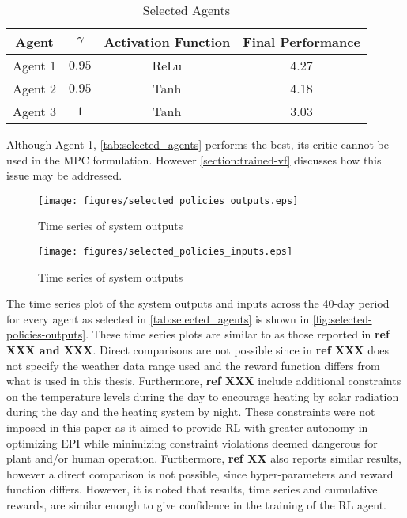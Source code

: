 \begin{table}[h]
    \centering
    \begin{tabular}{|c|c|c|c|}
    \hline
         Agent & $\gamma$ & Activation Function & Final Performance \\
         \hline
         Agent 1& $0.95$ & ReLu & 4.27 \\
         Agent 2& $0.95$ & Tanh & 4.18 \\
         Agent 3& $1$ & Tanh & 3.03 \\
         \hline
    \end{tabular}
    \caption{Selected Agents}
    \label{tab:selected_agents}
\end{table}

Although Agent 1, \autoref{tab:selected_agents} performs the best, its critic cannot be used in the MPC formulation. However \autoref{section:trained-vf} discusses how this issue may be addressed. 

\begin{figure}[H]
    \centering
    \texttt{[image: figures/selected\_policies\_outputs.eps]}
    \caption{Time series of system outputs}
    \label{fig:selected-policies-outputs}
\end{figure}



\begin{figure}[H]
    \centering
    \texttt{[image: figures/selected\_policies\_inputs.eps]}
    \caption{Time series of system outputs}
    \label{fig:selected-policies-inputs}
\end{figure}

The time series plot of the system outputs and inputs across the 40-day period for every agent as selected in \autoref{tab:selected_agents} is shown in \autoref{fig:selected-policies-outputs}. These time series plots are similar to as those reported in \textbf{ref XXX and XXX}. Direct comparisons are not possible since in \textbf{ref XXX} does not specify the weather data range used and the reward function differs from what is used in this thesis. Furthermore, \textbf{ref XXX} include additional constraints on the temperature levels during the day to encourage heating by solar radiation during the day and the heating system by night. These constraints were not imposed in this paper as it aimed to provide RL with greater autonomy in optimizing EPI while minimizing constraint violations deemed dangerous for plant and/or human operation. Furthermore, \textbf{ref XX} also reports similar results, however a direct comparison is not possible, since hyper-parameters and reward function differs. However, it is noted that results, time series and cumulative rewards, are similar enough to give confidence in the training of the RL agent.

